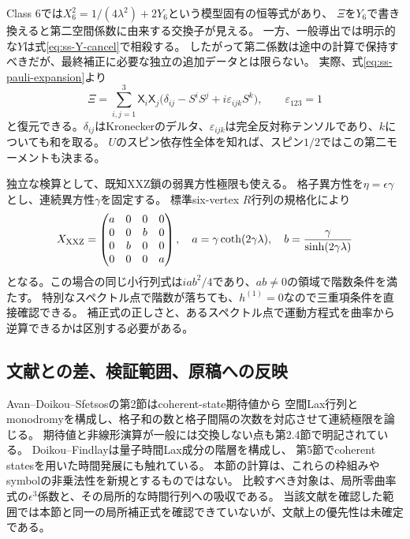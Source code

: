 Class 6では$X_6^2=1/(4\lambda^2)+2Y_6$という模型固有の恒等式があり、
$\Xi$を$Y_6$で書き換えると第二空間係数に由来する交換子が見える。
一方、一般導出では明示的な$Y$は式\eqref{eq:ss-Y-cancel}で相殺する。
したがって第二係数は途中の計算で保持すべきだが、最終補正に必要な独立の追加データとは限らない。
実際、式\eqref{eq:ss-pauli-expansion}より
\begin{equation}
\Xi=\sum_{i,j=1}^3\mathsf X_i\mathsf X_j
\bigl(\delta_{ij}-S^iS^j+i\varepsilon_{ijk}S^k\bigr),
\qquad\varepsilon_{123}=1
\label{eq:ss-Xi-from-U}
\end{equation}
と復元できる。$\delta_{ij}$はKroneckerのデルタ、$\varepsilon_{ijk}$は完全反対称テンソルであり、$k$についても和を取る。
$U$のスピン依存性全体を知れば、スピン$1/2$ではこの第二モーメントも決まる。

独立な検算として、既知XXZ鎖の弱異方性極限も使える。
格子異方性を$\eta=\epsilon\gamma$とし、連続異方性$\gamma$を固定する。
標準six-vertex $R$行列の規格化により
\begin{equation}
X_{\rm XXZ}=\begin{pmatrix}a&0&0&0\\0&0&b&0\\0&b&0&0\\0&0&0&a\end{pmatrix},
\quad a=\gamma\coth(2\gamma\lambda),\quad b=\frac{\gamma}{\sinh(2\gamma\lambda)}
\label{eq:ss-xxz-X}
\end{equation}
となる。この場合の同じ小行列式は$iab^2/4$であり、$ab\ne0$の領域で階数条件を満たす。
特別なスペクトル点で階数が落ちても、$h^{(1)}=0$なので三重項条件を直接確認できる。
補正式の正しさと、あるスペクトル点で運動方程式を曲率から逆算できるかは区別する必要がある。

\subsection{文献との差、検証範囲、原稿への反映}

Avan--Doikou--Sfetsos\cite{ADS2010}の第2節はcoherent-state期待値から
空間Lax行列とmonodromyを構成し、格子和の数と格子間隔の次数を対応させて連続極限を論じる。
期待値と非線形演算が一般には交換しない点も第2.4節で明記されている。
Doikou--Findlay\cite{DoikouFindlay2017}は量子時間Lax成分の階層を構成し、
第5節でcoherent statesを用いた時間発展にも触れている。
本節の計算は、これらの枠組みやsymbolの非乗法性を新規とするものではない。
比較すべき対象は、局所零曲率式の$\epsilon^3$係数と、その局所的な時間行列への吸収である。
当該文献を確認した範囲では本節と同一の局所補正式を確認できていないが、文献上の優先性は未確定である。

